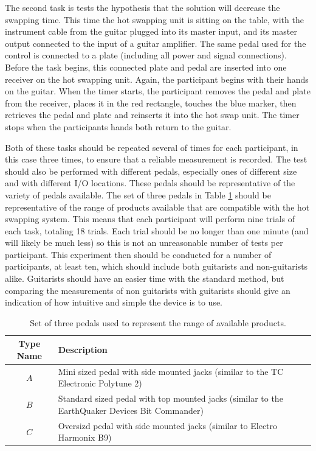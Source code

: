 \documentclass{article}
\begin{document}
	The second task is tests the hypothesis that the solution will decrease the swapping time.  This time the hot swapping unit is sitting on the table, with the instrument cable from the guitar plugged into its master input, and its master output connected to the input of a guitar amplifier.  The same pedal used for the control is connected to a plate (including all power and signal connections).  Before the task begins, this connected plate and pedal are inserted into one receiver on the hot swapping unit.  Again, the participant begins with their hands on the guitar.  When the timer starts, the participant removes the pedal and plate from the receiver, places it in the red rectangle, touches the blue marker, then retrieves the pedal and plate and reinserts it into the hot swap unit.  The timer stops when the participants hands both return to the guitar.  

	Both of these tasks should be repeated several of times for each participant, in this case three times, to ensure that a reliable measurement is recorded.  The test should also be performed with different pedals, especially ones of different size and with different I/O locations.  These pedals should be representative of the variety of pedals available.  The set of three pedals in Table \ref{tab:SwapTestPedals} should be representative of the range of products available that are compatible with the hot swapping system.  This means that each participant will perform nine trials of each task, totaling 18 trials.  Each trial should be no longer than one minute (and will likely be much less) so this is not an unreasonable number of tests per participant.  This experiment then should be conducted for a number of participants, at least ten, which should include both guitarists and non-guitarists alike.  Guitarists should have an easier time with the standard method, but comparing the measurements of non guitarists with guitarists should give an indication of how intuitive and simple the device is to use.  


	\begin{table}
	\begin{center}
	\begin{tabular}{ |c|p{8cm}| }
	\hline
	 Type Name & Description \\ 
	 \hline
	 $A$ & Mini sized pedal with side mounted jacks (similar to the TC Electronic Polytune 2) \\
	 $B$ & Standard sized pedal with top mounted jacks (similar to the EarthQuaker Devices Bit Commander) \\
	 $C$ & Oversizd pedal with side mounted jacks (similar to Electro Harmonix B9) \\
	 \hline
	\end{tabular}
	\caption{Set of three pedals used to represent the range of available products.}
	\label{tab:SwapTestPedals}
	\end{center}
	\end{table}
\end{document}
